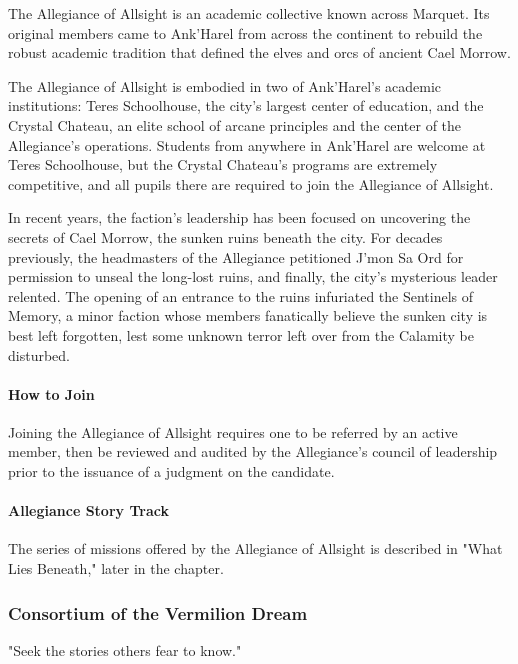 \documentclass[10pt,a4paper,twoside,bg=print,twocolumn,openany,nodeprecatedcode]{dndbook}
\begin{document}
The Allegiance of Allsight is an academic collective known across Marquet. Its original members came to Ank'Harel from across the continent to rebuild the robust academic tradition that defined the elves and orcs of ancient Cael Morrow.

The Allegiance of Allsight is embodied in two of Ank'Harel's academic institutions: Teres Schoolhouse, the city's largest center of education, and the Crystal Chateau, an elite school of arcane principles and the center of the Allegiance's operations. Students from anywhere in Ank'Harel are welcome at Teres Schoolhouse, but the Crystal Chateau's programs are extremely competitive, and all pupils there are required to join the Allegiance of Allsight.

In recent years, the faction's leadership has been focused on uncovering the secrets of Cael Morrow, the sunken ruins beneath the city. For decades previously, the headmasters of the Allegiance petitioned J'mon Sa Ord for permission to unseal the long-lost ruins, and finally, the city's mysterious leader relented. The opening of an entrance to the ruins infuriated the Sentinels of Memory, a minor faction whose members fanatically believe the sunken city is best left forgotten, lest some unknown terror left over from the Calamity be disturbed.

\paragraph{How to Join}
Joining the Allegiance of Allsight requires one to be referred by an active member, then be reviewed and audited by the Allegiance's council of leadership prior to the issuance of a judgment on the candidate.

\paragraph{Allegiance Story Track}
The series of missions offered by the Allegiance of Allsight is described in "What Lies Beneath," later in the chapter.

\subsubsection{Consortium of the Vermilion Dream}
"Seek the stories others fear to know."
\end{document}
